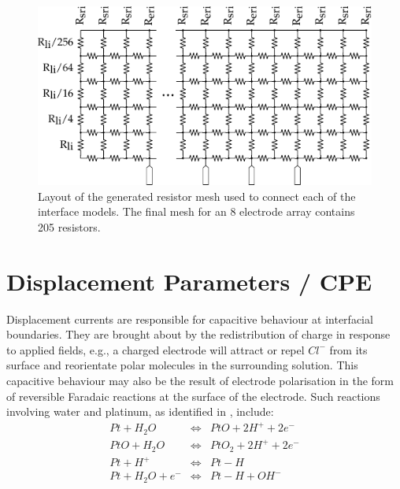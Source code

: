 \documentclass[journal, a4paper]{IEEEtran}
\begin{document}
\begin{figure}
    \begin{center}
        \includegraphics[width=\columnwidth]{graphics/resistorMesh_sideways}
    \end{center}
    \caption{Layout of the generated resistor mesh used to connect each of the interface models. The final mesh for an 8 electrode array contains 205 resistors.}
    \label{fig:mesh}
\end{figure}



\section{Displacement Parameters / CPE}
\label{sect:cpe}
Displacement currents are responsible for capacitive behaviour at interfacial boundaries.
They are brought about by the redistribution of charge in response to applied fields, e.g., a charged electrode will attract or repel $Cl^{-}$ from its surface and reorientate polar molecules in the surrounding solution.\cite{Merrill05} This capacitive behaviour may also be the result of electrode polarisation in the form of reversible Faradaic reactions at the surface of the electrode.
Such reactions involving water and platinum, as identified in \cite{Horch2004,Mohtashami2011,Merrill05}, include:
\begin{eqnarray}
    Pt + H_{2}O &\Leftrightarrow& PtO + 2 H^{+} + 2 e^{-}\\
    PtO + H_{2}O &\Leftrightarrow& PtO_{2} + 2 H^{+} + 2e^{-}\\
    Pt + H^{+} & \Leftrightarrow & Pt-H\\
    Pt + H_{2}O + e^{-} &\Leftrightarrow& Pt-H+OH^{-}
\end{eqnarray}
\end{document}
